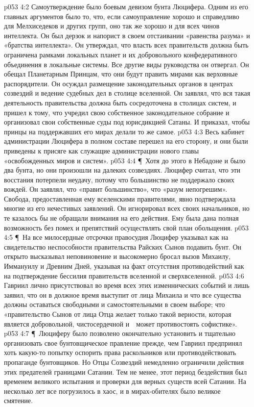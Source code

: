 \vs p053 4:2 Самоутверждение было боевым девизом бунта Люцифера. Одним из его главных аргументов было то, что, если самоуправление хорошо и справедливо для Мелхиседеков и других групп, оно так же хорошо и для всех чинов интеллекта. Он был дерзок и напорист в своем отстаивании «равенства разума» и «братства интеллекта». Он утверждал, что власть всех правительств должна быть ограничена рамками локальных планет и их добровольного конфедеративного объединения в локальные системы. Все другие виды руководства он отвергал. Он обещал Планетарным Принцам, что они будут править мирами как верховные распорядители. Он осуждал размещение законодательных органов в центрах созвездий и ведение судебных дел в столице вселенной. Он заявлял, что вся такая деятельность правительства должна быть сосредоточена в столицах систем, и пришел к тому, что учредил свою собственное законодательное собрание и организовал свои собственные суды под юрисдикцией Сатаны. И приказал, чтобы принцы на поддержавших его мирах делали то же самое.
\vs p053 4:3 Весь кабинет администрации Люцифера в полном составе перешел на его сторону, и они были приведены к присяге как служащие администрации нового главы «освобожденных миров и систем».
\vs p053 4:4 \P\ Хотя до этого в Небадоне и было два бунта, но они произошли на далеких созвездиях. Люцифер считал, что эти восстания потерпели неудачу, потому что большинство не поддержало своих вождей. Он заявлял, что «правит большинство», что «разум непогрешим». Свобода, предоставленная ему вселенскими правителями, явно подтверждала многие из его нечестивых заявлений. Он игнорировал всех своих начальников, но те казалось бы не обращали внимания на его действия. Ему была дана полная возможность без помех и препятствий осуществлять свой план обольщения.
\vs p053 4:5 \P\ На все милосердные отсрочки правосудия Люцифер указывал как на свидетельство неспособности правительства Райских Сынов подавить бунт. Он открыто высказывал неповиновение и высокомерно бросал вызов Михаилу, Иммануилу и Древним Дней, указывая на факт отсутствия противодействий как на подтверждение бессилия правительств вселенной и сверхвселенной.
\vs p053 4:6 Гавриил лично присутствовал во время всех этих изменнических событий и лишь заявил, что он в должное время выступит от лица Михаила и что все существа должны оставаться свободными и самостоятельными в своем выборе; что «правительство Сынов от лица Отца желает только такой верности, которая является добровольной, чистосердечной и　может противостоять софистике».
\vs p053 4:7 \P\ Люциферу было позволено окончательно установить и тщательно организовать свое бунтовщическое правление прежде, чем Гавриил предпринял хоть какую\hyp{}то попытку оспорить права раскольников или противодействовать пропаганде бунтовщиков. Но Отцы Созвездий немедленно ограничили действия этих предателей границами Сатании. Тем не менее, этот период бездействия был временем великого испытания и проверки для верных существ всей Сатании. На несколько лет все погрузилось в хаос, и в мирах\hyp{}обителях было великое смятение.
